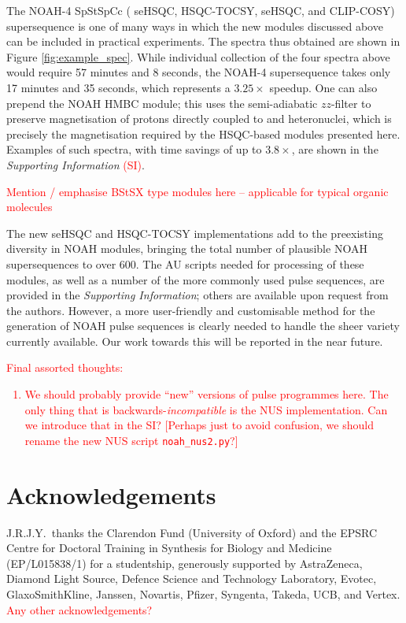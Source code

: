 \documentclass[11pt]{article}
\newcommand*{\carbon}{\ce{^{13}C}}
\newcommand*{\nitrogen}{\ce{^{15}N}}
\newcommand*{\red}[1]{\textcolor{red}{#1}}
\newcommand*{\figref}[1]{Figure \ref{fig:#1}}
\newcommand*{\SInf}{\textit{Supporting Information}}
\newcommand*{\sitodo}{\red{(SI)}}
\begin{document}
The NOAH-4 SpStSpCc (\nitrogen{} seHSQC, \carbon{} HSQC-TOCSY, \carbon{} seHSQC, and CLIP-COSY) supersequence is one of many ways in which the new modules discussed above can be included in practical experiments.
The spectra thus obtained are shown in \figref{example_spec}.
While individual collection of the four spectra above would require 57 minutes and 8 seconds, the NOAH-4 supersequence takes only 17 minutes and 35 seconds, which represents a $3.25\times$ speedup.
One can also prepend the NOAH HMBC module;\autocite{Kupce2019JMR} this uses the semi-adiabatic $zz$-filter to preserve magnetisation of protons directly coupled to \carbon{} and \nitrogen{} heteronuclei, which is precisely the magnetisation required by the HSQC-based modules presented here.
Examples of such spectra, with time savings of up to $3.8\times$, are shown in the \SInf{} \sitodo{}.

\red{Mention / emphasise BStSX type modules here -- applicable for typical organic molecules}

The new seHSQC and HSQC-TOCSY implementations add to the preexisting diversity in NOAH modules, bringing the total number of plausible NOAH supersequences to over 600.
The AU scripts needed for processing of these modules, as well as a number of the more commonly used pulse sequences, are provided in the \SInf{}; others are available upon request from the authors.
However, a more user-friendly and customisable method for the generation of NOAH pulse sequences is clearly needed to handle the sheer variety currently available.
Our work towards this will be reported in the near future.

\red{
    Final assorted thoughts:
    \begin{enumerate}
        \item We should probably provide ``new'' versions of pulse programmes here. The only thing that is backwards-\textit{incompatible} is the NUS implementation. Can we introduce that in the SI? [Perhaps just to avoid confusion, we should rename the new NUS script \texttt{noah\_nus2.py}?]
    \end{enumerate}
}


\section*{Acknowledgements}

J.R.J.Y.\ thanks the Clarendon Fund (University of Oxford) and the EPSRC Centre for Doctoral Training in Synthesis for Biology and Medicine (EP/L015838/1) for a studentship, generously supported by AstraZeneca, Diamond Light Source, Defence Science and Technology Laboratory, Evotec, GlaxoSmithKline, Janssen, Novartis, Pfizer, Syngenta, Takeda, UCB, and Vertex.
\red{Any other acknowledgements?}

\printbibliography


\end{document}
